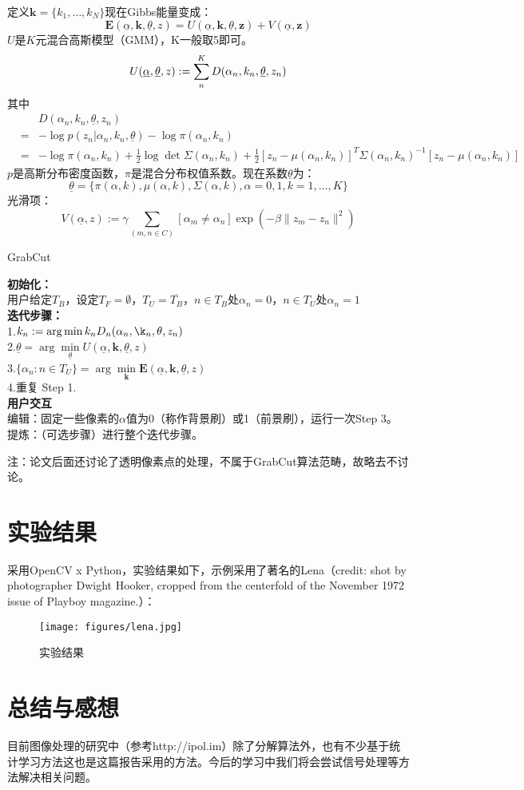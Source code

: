 \documentclass[a4paper, 11pt, nofonts, nocap, fancyhdr, hyperref, UTF8]{ctexart}
\begin{document}
定义$\textbf{k} = \{k_1,\ldots,k_N\}$现在Gibbs能量变成：
$$
\textbf{E}(\underline{\alpha},\textbf{k},\underline{\theta},z) = U(\underline{\alpha},\textbf{k},\underline{\theta},\textbf{z})+V(\underline{\alpha},\textbf{z})
$$
$U$是$K$元混合高斯模型（GMM），K一般取5即可。
$$
U(\underline{\alpha},\underline{\theta},z) := \sum \limits_n \limits^K D(\alpha_n,k_n,\underline{\theta},z_n) \\
$$
其中
\begin{eqnarray}
&&D(\alpha_n,k_n,\underline{\theta},z_n)\nonumber\\
&=&-\log p(z_n|\alpha_n,k_n,\underline{\theta})-\log\pi(\alpha_n,k_n) \nonumber\\
&=& -\log \pi(\alpha_n,k_n)+\frac{1}{2}\log\det \Sigma(\alpha_n,k_n)+\frac{1}{2}[z_n-\mu(\alpha_n,k_n)]^T\Sigma(\alpha_n,k_n)^{-1}[z_n-\mu(\alpha_n,k_n)]\nonumber
\end{eqnarray}
$p$是高斯分布密度函数，$\pi$是混合分布权值系数。现在系数$\underline{\theta}$为：
$$
\underline{\theta} = \{\pi(\alpha,k), \mu(\alpha,k), \Sigma(\alpha,k), \alpha = 0,1, k = 1,\ldots,K\}
$$
光滑项：
$$
V(\underline{\alpha},z) := \gamma \sum_{(m,n \in C)} [\alpha_m \neq \alpha_n]  \exp (-\beta \|z_m - z_n\|^2)
$$

\begin{algorithm}
\caption{GrabCut}\label{GC}
\textbf{初始化：}\\用户给定$T_B$，设定$T_F = \emptyset$，$T_U = \overline{T_B}$，$n \in T_B$处$\alpha_n = 0$，$n \in T_U$处$\alpha_n = 1$\\
\textbf{迭代步骤：}\\
1.$k_n := \arg \min \limits{k_n} D_n(\alpha_n,\k_n,\theta, z_n)$\\
2.$\underline{\theta}=\arg \min \limits_{\underline{\theta}} U(\underline{\alpha},\textbf{k},\underline{\theta},z)$\\
3.$\{\alpha_n:n \in T_U\} = \arg \min \limits_{\textbf{k}} \textbf{E}(\underline{\alpha},\textbf{k},\underline{\theta},z)$\\
4.重复 Step 1.\\
\textbf{用户交互}\\
编辑：固定一些像素的$\alpha$值为0（称作背景刷）或1（前景刷），运行一次Step 3。\\
提炼：（可选步骤）进行整个迭代步骤。
\end{algorithm}

注：论文后面还讨论了透明像素点的处理，不属于GrabCut算法范畴，故略去不讨论。

\section{实验结果}
采用OpenCV\cite{bradski2008learning} x Python，实验结果如下，示例采用了著名的Lena（credit: shot by photographer Dwight Hooker, cropped from the centerfold of the November 1972 issue of Playboy magazine.）：
\begin{figure}[!h]
    \centering
    \texttt{[image: figures/lena.jpg]}
    \caption{实验结果}
\end{figure}

\section{总结与感想}
目前图像处理的研究中（参考http://ipol.im）除了分解算法外，也有不少基于统计学习方法这也是这篇报告采用的方法。今后的学习中我们将会尝试信号处理等方法解决相关问题。



\end{document}
